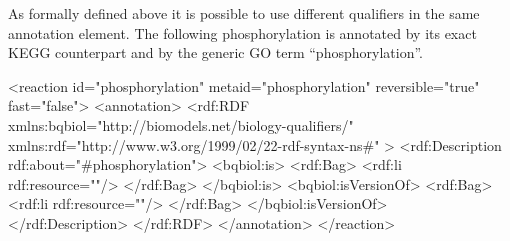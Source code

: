 As formally defined above it is possible to use different
qualifiers in the same annotation element. The following
phosphorylation is annotated by its exact KEGG counterpart and by
the generic GO term ``phosphorylation''.

\begin{example}
<reaction id="phosphorylation" metaid="phosphorylation"
          reversible="true" fast="false">
  <annotation>
    <rdf:RDF
      xmlns:bqbiol="http://biomodels.net/biology-qualifiers/"
      xmlns:rdf="http://www.w3.org/1999/02/22-rdf-syntax-ns\#"
    >
      <rdf:Description rdf:about="\#phosphorylation">
        <bqbiol:is>
          <rdf:Bag>
            <rdf:li rdf:resource="\!"/>
          </rdf:Bag>
        </bqbiol:is>
        <bqbiol:isVersionOf>
          <rdf:Bag>
            <rdf:li rdf:resource="\!"/>
          </rdf:Bag>
        </bqbiol:isVersionOf>
      </rdf:Description>
    </rdf:RDF>
  </annotation>
</reaction>
\end{example}

